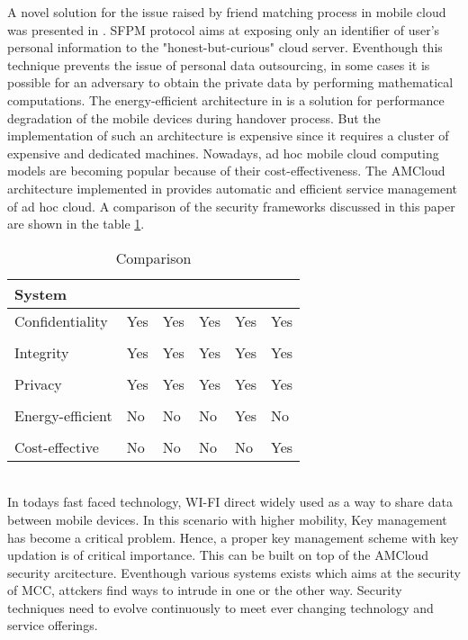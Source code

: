 \documentclass[10pt,a4paper,journal]{IEEEtran}
\begin{document}
\hspace*{2em} A novel solution for the issue raised by friend matching process in mobile cloud was presented in \cite{2}. SFPM protocol aims at exposing only an identifier of user's personal information to the "honest-but-curious" cloud server. Eventhough this technique prevents the issue of personal data outsourcing, in some cases it is possible for an adversary to obtain the private data by performing mathematical computations. The energy-efficient architecture in \cite{3} is a solution for performance degradation of the mobile devices during handover process. But the implementation of such an architecture is expensive since it requires a cluster of expensive and dedicated machines. Nowadays, ad hoc mobile cloud computing models are becoming popular because of their cost-effectiveness. The AMCloud architecture implemented in \cite{1} provides automatic and efficient service management of ad hoc cloud. A comparison of the security frameworks discussed in this paper are shown in the table \ref{t2}.

\begin{table}[h]
\begin{center}
\caption[Comparison]{Comparison} 
\begin{tabular}{l l l l l l{5cm}}
\hline
System   & \cite{4}  & \cite{5}  & 	\cite{2}& \cite{3} &  \cite{1} \\
\hline
Confidentiality  &  	Yes  	& 	Yes  	 & 	  Yes  	 & 		Yes  		& 		Yes  \\
\\
Integrity  & 	 Yes 	& 	Yes 	 & 	  Yes    & 		    Yes  		& 		Yes\\
\\
Privacy	 & 	 Yes  	& 	Yes 	 & 	  Yes    &		   Yes  		& 		Yes  \\
\\
Energy-efficient  &		No 		& 	No	 &    No   & 			Yes  	& 	  No  \\ 
\\
Cost-effective  & 	No  	& 	No 	 & 	  No    & 			No		& 		Yes \\
\hline
\end{tabular}
\end{center}
\label{t2}
\end{table}\\
\hspace*{2em} In todays fast faced technology, WI-FI direct widely used as a way to share data between mobile devices. In this scenario with higher mobility, Key management has become a critical problem. Hence, a proper key management scheme with key updation is of critical importance. This can be built on top of the AMCloud security arcitecture. Eventhough various systems exists which aims at the security of MCC, attckers find ways to intrude in one or the other way. Security techniques need to evolve continuously to meet ever changing technology and service offerings. 
\end{document}
